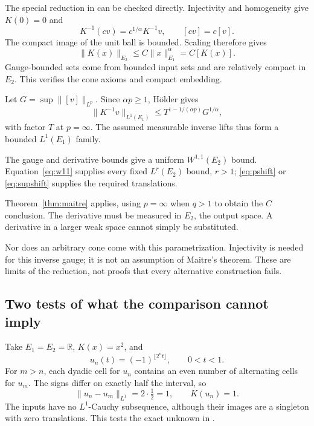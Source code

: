 \documentclass[12pt,reqno]{amsart}
\begin{document}
\begin{proposition}\label{prop:overlap}

\end{proposition}

The special reduction in \cite[Section 4, pp.~15--16]{S-barrett-suli} can be checked directly. Injectivity and homogeneity give $K(0)=0$ and
\[
K^{-1}(cv)=c^{1/\alpha}K^{-1}v,\qquad [cv]=c[v].
\]
The compact image of the unit ball is bounded. Scaling therefore gives
\[
\|K(x)\|_{E_2}\le C\|x\|_{E_1}^{\alpha}=C[K(x)].
\]
Gauge-bounded sets come from bounded input sets and are relatively compact in $E_2$. This verifies the cone axioms and compact embedding.

Let $G=\sup\|[v]\|_{L^p}$. Since $\alpha p\ge1$, H\"older gives
\begin{equation}\label{eq:lift}
\|K^{-1}v\|_{L^1(E_1)}\le T^{1-1/(\alpha p)}G^{1/\alpha},
\end{equation}
with factor $T$ at $p=\infty$. The assumed measurable inverse lifts thus form a bounded $L^1(E_1)$ family.

The gauge and derivative bounds give a uniform $W^{1,1}(E_2)$ bound. Equation~\eqref{eq:w11} supplies every fixed $L^r(E_2)$ bound, $r>1$; \eqref{eq:pshift} or \eqref{eq:supshift} supplies the required translations.

Theorem~\ref{thm:maitre} applies, using $p=\infty$ when $q>1$ to obtain the $C$ conclusion. The derivative must be measured in $E_2$, the output space. A derivative in a larger weak space cannot simply be substituted.

Nor does an arbitrary cone come with this parametrization. Injectivity is needed for this inverse gauge; it is not an assumption of Maitre's theorem. These are limits of the reduction, not proofs that every alternative construction fails.
\subsection{Two tests of what the comparison cannot imply}

Take $E_1=E_2=\mathbb R$, $K(x)=x^2$, and
\[
u_n(t)=(-1)^{\lfloor2^nt\rfloor},\qquad 0<t<1.
\]
For $m>n$, each dyadic cell for $u_n$ contains an even number of alternating cells for $u_m$. The signs differ on exactly half the interval, so
\[
\|u_n-u_m\|_{L^1}=2\cdot\tfrac12=1,
\qquad K(u_n)=1.
\]
The inputs have no $L^1$-Cauchy subsequence, although their images are a singleton with zero translations. This tests the exact unknown in \cite[Theorem 2.1 and Remark 2.2(3), p.~1726]{S-maitre}.
\end{document}
